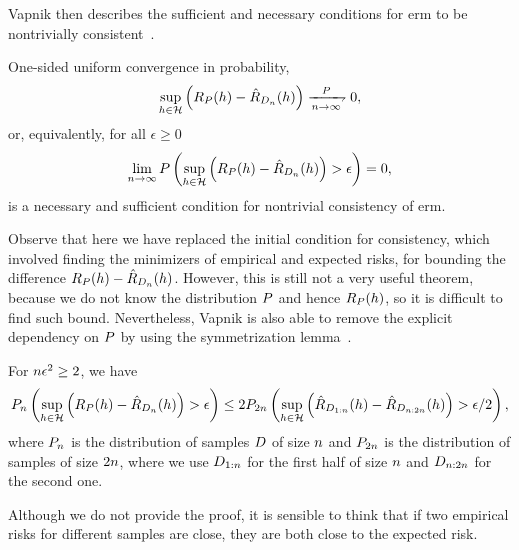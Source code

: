 Vapnik then describes the sufficient and necessary conditions for \acrshort{erm} to be nontrivially consistent~\citep{Vapnik00}.
\begin{theorem}
    One-sided uniform convergence in probability, 
    \begin{equation}
        \nonumber
        \sup_{\hypf \in \hypspace} \left(\exprisk(\hypf) - \empriskn(\hypf) \right) \xrightharpoondown[\nsamples \to \infty]{\distf}  0,
    \end{equation}    
    or, equivalently, for all $\epsilon \geq 0$
    \begin{equation}
        \nonumber
        \lim_{n \to \infty} P\left(\sup_{h \in \mathcal{H}} \left(R_P(h) - \hat{R}_{D_{n}}(h) \right) > \epsilon \right) = 0,
    \end{equation}
    is a necessary and sufficient condition for nontrivial consistency of \acrshort{erm}.
\end{theorem}
Observe that here we have replaced the initial condition for consistency, which involved finding the minimizers of empirical and expected risks, for bounding the difference $R_P(h) - \hat{R}_{D_{n}}(h)$.
However, this is still not a very useful theorem, because we do not know the distribution $P$ and hence $R_P(h)$, so it is difficult to find such bound.
Nevertheless, Vapnik is also able to remove the explicit dependency on $P$ by using the symmetrization lemma~\citep{vapnik1982estimation}.
\begin{lemma}[Symmetrization]\label{lemma:symetrization}
    For $n \epsilon^2 \geq 2$, we have 
    \begin{equation}
        \nonumber
        P_{n}\left(\sup_{h \in \mathcal{H}} \left(R_P(h) - \hat{R}_{D_{n}}(h) \right) > \epsilon \right) 
        \leq 
        2P_{2 n} \left(\sup_{h \in \mathcal{H}} \left(\hat{R}_{D_{1:n}}(h) - \hat{R}_{D_{n: 2n}}(h) \right) > \epsilon/2 \right),
    \end{equation}
    where $P_{n}$ is the distribution of samples $D$ of size $n$ and $P_{2 n}$ is the distribution of samples of size $2 n$, where we use $D_{1:n}$ for the first half of size $n$ and $D_{n: 2n}$ for the second one.
\end{lemma}
Although we do not provide the proof, it is sensible to think that if two empirical risks for different samples are close, they are both close to the expected risk.
